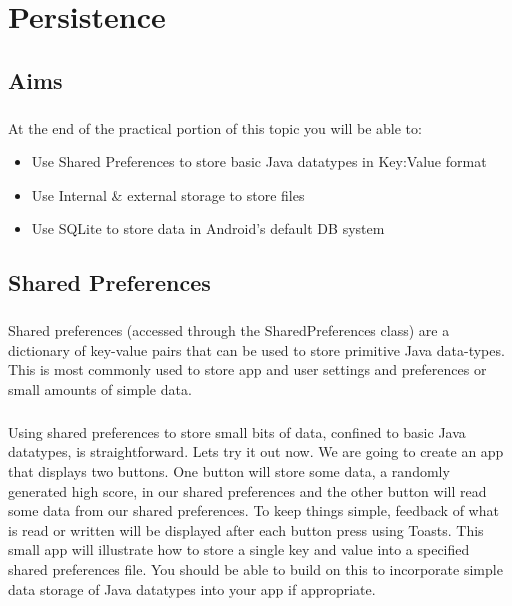 \chapter{Persistence}
\section{Aims}
\paragraph{} At the end of the practical portion of this topic you will be able to:

\begin{itemize}
\item Use Shared Preferences to store basic Java datatypes in Key:Value format
\item Use Internal \& external storage to store files
\item Use SQLite to store data in Android's default DB system
\end{itemize}

\section{Shared Preferences}
\paragraph{} Shared preferences (accessed through the SharedPreferences class) are a dictionary of key-value pairs that can be used to store primitive Java data-types. This is most commonly used to store app and user settings and preferences or small amounts of simple data. 

\paragraph{} Using shared preferences to store small bits of data, confined to basic Java datatypes, is straightforward. Lets try it out now.  We are going to create an app that displays two buttons. One button will store some data, a randomly generated high score, in our shared preferences and the other button will read some data from our shared preferences. To keep things simple, feedback of what is read or written will be displayed after each button press using Toasts. This small app will illustrate how to store a single key and value into a specified shared preferences file. You should be able to build on this to incorporate simple data storage of Java datatypes into your app if appropriate.

